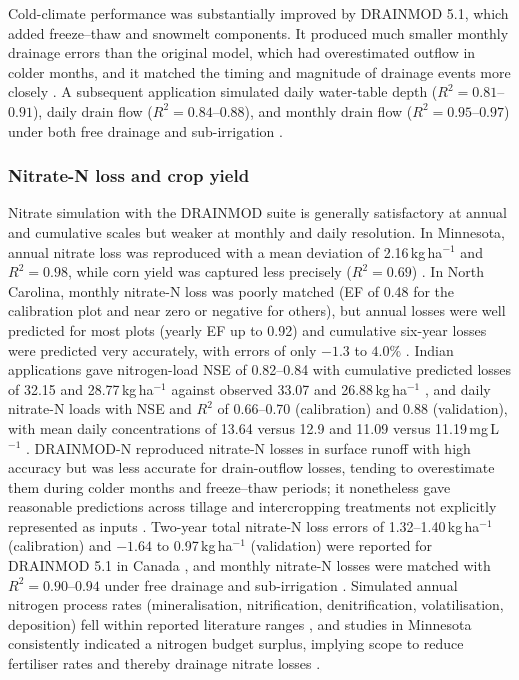 \documentclass[11pt]{article}
\begin{document}
Cold-climate performance was substantially improved by DRAINMOD 5.1, which added freeze--thaw and snowmelt components. It produced much smaller monthly drainage errors than the original model, which had overestimated outflow in colder months, and it matched the timing and magnitude of drainage events more closely \parencite{Wang2006c}. A subsequent application simulated daily water-table depth ($R^2 = 0.81$--$0.91$), daily drain flow ($R^2 = 0.84$--$0.88$), and monthly drain flow ($R^2 = 0.95$--$0.97$) under both free drainage and sub-irrigation \parencite{Dayyani2010b}.

\subsubsection{Nitrate-N loss and crop yield}

Nitrate simulation with the DRAINMOD suite is generally satisfactory at annual and cumulative scales but weaker at monthly and daily resolution. In Minnesota, annual nitrate loss was reproduced with a mean deviation of 2.16\,kg\,ha$^{-1}$ and $R^2 = 0.98$, while corn yield was captured less precisely ($R^2 = 0.69$) \parencite{Zhao2000}. In North Carolina, monthly nitrate-N loss was poorly matched (EF of 0.48 for the calibration plot and near zero or negative for others), but annual losses were well predicted for most plots (yearly EF up to 0.92) and cumulative six-year losses were predicted very accurately, with errors of only $-1.3$ to $4.0\%$ \parencite{Youssef2006}. Indian applications gave nitrogen-load NSE of 0.82--0.84 with cumulative predicted losses of 32.15 and 28.77\,kg\,ha$^{-1}$ against observed 33.07 and 26.88\,kg\,ha$^{-1}$ \parencite{Dar2022}, and daily nitrate-N loads with NSE and $R^2$ of 0.66--0.70 (calibration) and 0.88 (validation), with mean daily concentrations of 13.64 versus 12.9 and 11.09 versus 11.19\,mg\,L$^{-1}$ \parencite{Dar2025}. DRAINMOD-N reproduced nitrate-N losses in surface runoff with high accuracy but was less accurate for drain-outflow losses, tending to overestimate them during colder months and freeze--thaw periods; it nonetheless gave reasonable predictions across tillage and intercropping treatments not explicitly represented as inputs \parencite{Yang2007}. Two-year total nitrate-N loss errors of 1.32--1.40\,kg\,ha$^{-1}$ (calibration) and $-1.64$ to 0.97\,kg\,ha$^{-1}$ (validation) were reported for DRAINMOD 5.1 in Canada \parencite{Wang2006c}, and monthly nitrate-N losses were matched with $R^2 = 0.90$--$0.94$ under free drainage and sub-irrigation \parencite{Dayyani2010b}. Simulated annual nitrogen process rates (mineralisation, nitrification, denitrification, volatilisation, deposition) fell within reported literature ranges \parencite{Salazar2009}, and studies in Minnesota consistently indicated a nitrogen budget surplus, implying scope to reduce fertiliser rates and thereby drainage nitrate losses \parencite{Ale2013}.
\end{document}
